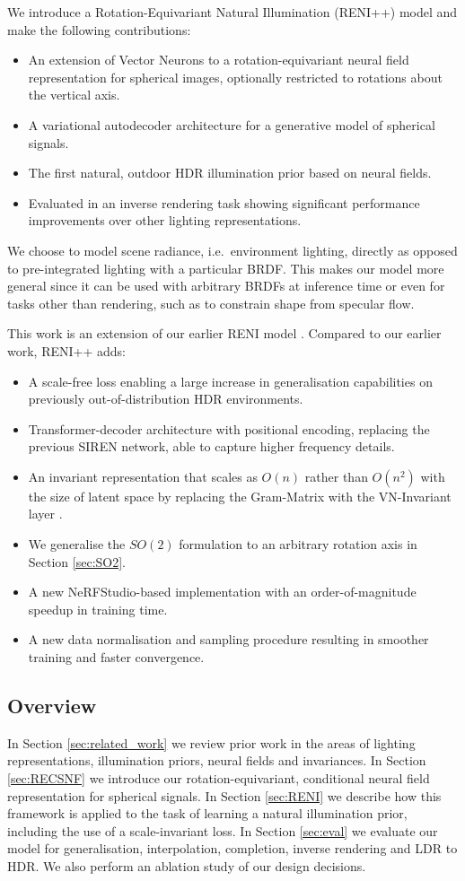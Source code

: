 We introduce a Rotation-Equivariant Natural Illumination (RENI++) model and make the following contributions:
\begin{itemize}[leftmargin=*]
\item[--] An extension of Vector Neurons to a rotation-equivariant neural field representation for spherical images, optionally restricted to rotations about the vertical axis.
\item[--] A variational autodecoder architecture for a generative model of spherical signals.
\item[--] The first natural, outdoor HDR illumination prior based on neural fields.
\item[--] Evaluated in an inverse rendering task showing significant performance improvements over other lighting representations.
\end{itemize}
We choose to model scene radiance, i.e.~environment lighting, directly as opposed to pre-integrated lighting with a particular BRDF. This makes our model more general since it can be used with arbitrary BRDFs at inference time or even for tasks other than rendering, such as to constrain shape from specular flow.

This work is an extension of our earlier RENI model \cite{gardner2022rotation}. Compared to our earlier work, RENI++ adds: 
\begin{itemize}
\item[--] A scale-free loss enabling a large increase in generalisation capabilities on previously out-of-distribution HDR environments.
\item[--] Transformer-decoder architecture with positional encoding, replacing the previous SIREN network, able to capture higher frequency details.
\item[--] An invariant representation that scales as \(O(n)\) rather than \(O(n^{2})\) with the size of latent space by replacing the Gram-Matrix with the VN-Invariant layer \cite{deng_vector_2021}.
\item[--] We generalise the $SO(2)$ formulation to an arbitrary rotation axis in Section \ref{sec:SO2}.
\item[--] A new NeRFStudio-based \cite{nerfstudio} implementation with an order-of-magnitude speedup in training time. 
\item[--] A new data normalisation and sampling procedure resulting in smoother training and faster convergence.
\end{itemize}
\subsection{Overview}

In Section \ref{sec:related_work} we review prior work in the areas of lighting representations, illumination priors, neural fields and invariances. In Section \ref{sec:RECSNF} we introduce our rotation-equivariant, conditional neural field representation for spherical signals. In Section \ref{sec:RENI} we describe how this framework is applied to the task of learning a natural illumination prior, including the use of a scale-invariant loss. In Section \ref{sec:eval} we evaluate our model for generalisation, interpolation, completion, inverse rendering and LDR to HDR. We also perform an ablation study of our design decisions.
